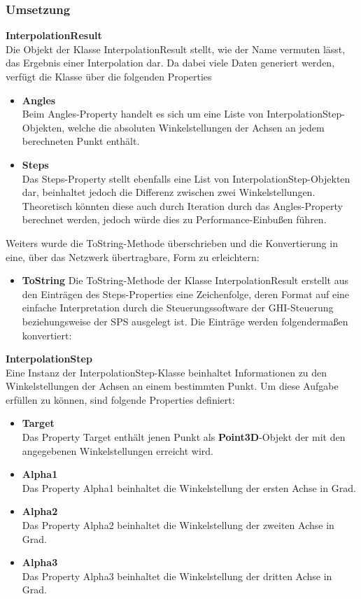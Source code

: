 \subsubsection{Umsetzung}
\textbf{InterpolationResult}\\
Die Objekt der Klasse InterpolationResult stellt, wie der Name vermuten lässt, das Ergebnis einer Interpolation dar. Da dabei viele Daten generiert werden, verfügt die Klasse über die folgenden Properties
\begin{itemize}
\item \textbf{Angles}\\
Beim Angles-Property handelt es sich um eine Liste von InterpolationStep-Objekten, welche die absoluten Winkelstellungen der Achsen an jedem berechneten Punkt enthält. 
\item \textbf{Steps}\\
Das Steps-Property stellt ebenfalls eine List von InterpolationStep-Objekten dar, beinhaltet jedoch die Differenz zwischen zwei Winkelstellungen. Theoretisch könnten diese auch durch Iteration durch das Angles-Property berechnet werden, jedoch würde dies zu Performance-Einbußen führen. 
\end{itemize}
Weiters wurde die ToString-Methode überschrieben und die Konvertierung in eine, über das Netzwerk übertragbare, Form zu erleichtern:
\begin{itemize}
\item \textbf{ToString}
Die ToString-Methode der Klasse InterpolationResult erstellt aus den Einträgen des Steps-Properties eine Zeichenfolge, deren Format auf eine einfache Interpretation durch die Steuerungssoftware der GHI-Steuerung beziehungsweise der SPS ausgelegt ist. Die Einträge werden folgendermaßen konvertiert:\\
\end{itemize}
\textbf{InterpolationStep}\\
Eine Instanz der InterpolationStep-Klasse beinhaltet Informationen zu den Winkelstellungen der Achsen an einem bestimmten Punkt. Um diese Aufgabe erfüllen zu können, sind folgende Properties definiert:
\begin{itemize}
\item \textbf{Target}\\
Das Property Target enthält jenen Punkt als \textbf{Point3D}-Objekt der mit den angegebenen Winkelstellungen erreicht wird.
\item \textbf{Alpha1}\\
Das Property Alpha1 beinhaltet die Winkelstellung der ersten Achse in Grad.
\item \textbf{Alpha2}\\
Das Property Alpha2 beinhaltet die Winkelstellung der zweiten Achse in Grad.
\item \textbf{Alpha3}\\
Das Property Alpha3 beinhaltet die Winkelstellung der dritten Achse in Grad.
\end{itemize} 
